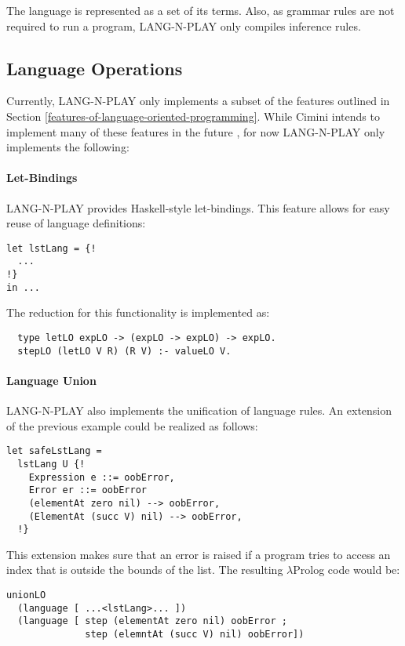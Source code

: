 The language is represented as a set of its terms. Also, as grammar rules are not required to run a program, LANG-N-PLAY only compiles inference rules.


\subsection{Language Operations}
Currently, LANG-N-PLAY only implements a subset of the features outlined in Section \ref{features-of-language-oriented-programming}. While Cimini intends to implement many of these features in the future \cite{cimini_effectiveness_2020}, for now LANG-N-PLAY only implements the following:

\paragraph{Let-Bindings}
LANG-N-PLAY provides Haskell-style let-bindings. This feature allows for easy reuse of language definitions:

\begin{lstlisting}
let lstLang = {!
  ...
!}
in ...
\end{lstlisting}

The reduction for this functionality is implemented as:

\begin{lstlisting}
  type letLO expLO -> (expLO -> expLO) -> expLO.
  stepLO (letLO V R) (R V) :- valueLO V.
\end{lstlisting}

\paragraph{Language Union}
LANG-N-PLAY also implements the unification of language rules. An extension of the previous example could be realized as follows:

\begin{lstlisting}
let safeLstLang = 
  lstLang U {!
    Expression e ::= oobError,
    Error er ::= oobError
    (elementAt zero nil) --> oobError,
    (ElementAt (succ V) nil) --> oobError,
  !}
\end{lstlisting}

This extension makes sure that an error is raised if a program tries to access an index that is outside the bounds of the list. The resulting $\lambda$Prolog code would be:

\begin{lstlisting}
unionLO
  (language [ ...<lstLang>... ])
  (language [ step (elementAt zero nil) oobError ;
              step (elemntAt (succ V) nil) oobError])
\end{lstlisting}

